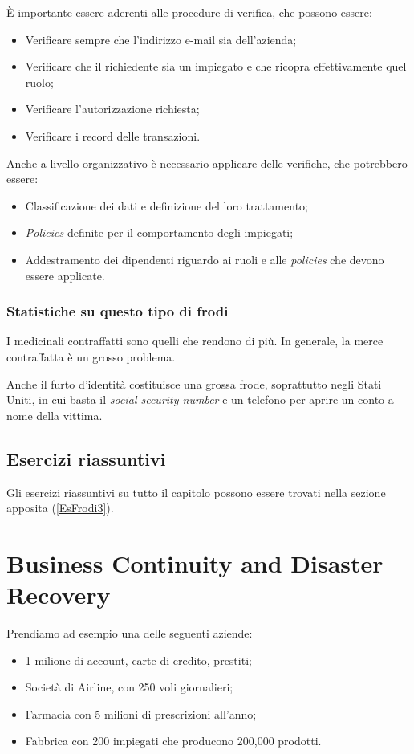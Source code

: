È importante essere aderenti alle procedure di verifica, che possono essere:
\begin{itemize}
  \item Verificare sempre che l'indirizzo e-mail sia dell'azienda;
  \item Verificare che il richiedente sia un impiegato e che ricopra
  effettivamente quel ruolo;
  \item Verificare l'autorizzazione richiesta;
  \item Verificare i record delle transazioni.
\end{itemize}

Anche a livello organizzativo è necessario applicare delle verifiche, che
potrebbero essere:
\begin{itemize}
  \item Classificazione dei dati e definizione del loro trattamento;
  \item \textit{Policies} definite per il comportamento degli impiegati;
  \item Addestramento dei dipendenti riguardo ai ruoli e alle \textit{policies}
che devono essere applicate.
\end{itemize}

\subsection{Statistiche su questo tipo di frodi}

I medicinali contraffatti sono quelli che rendono di più. In generale, la merce
contraffatta è un grosso problema.

Anche il furto d'identità costituisce una grossa frode, soprattutto negli
Stati Uniti, in cui basta il \emph{social security number} e un telefono per
aprire un conto a nome della vittima.

\section{Esercizi riassuntivi}

Gli esercizi riassuntivi su tutto il capitolo possono essere trovati nella
sezione apposita (\ref{EsFrodi3}).

\chapter{Business Continuity and Disaster Recovery}
\label{BCDR}

Prendiamo ad esempio una delle seguenti aziende:
\begin{itemize}
  \item 1 milione di account, carte di credito, prestiti;
  \item Società di Airline, con 250 voli giornalieri;
  \item Farmacia con 5 milioni di prescrizioni all'anno;
  \item Fabbrica con 200 impiegati che producono 200,000 prodotti.
\end{itemize}


